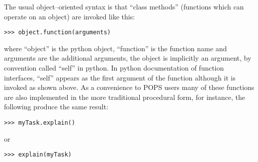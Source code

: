 \documentclass[11pt]{report}
\begin{document}
The usual object--oriented syntax is that ``class methods'' (functions
which can operate on an object)  are invoked like this:
\begin{verbatim}
>>> object.function(arguments)
\end{verbatim}
where ``object'' is the python object, ``function'' is the function
name and arguments are the additional arguments, the object is
implicitly an argument, by convention called ``self'' in python.
In python documentation of function interfaces, ``self'' appears as the
first argument of the function although it is invoked as shown above.
As a convenience to POPS users many of these functions are also
implemented in the more traditional procedural form, for instance, the
following produce the same result:
\begin{verbatim}
>>> myTask.explain()
\end{verbatim}
or
\begin{verbatim}
>>> explain(myTask)
\end{verbatim}
\end{document}
